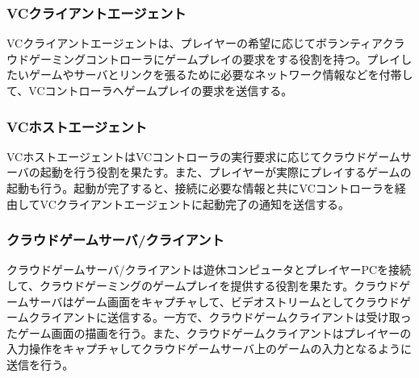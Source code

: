 
\subsubsection{VCクライアントエージェント}
VCクライアントエージェントは、プレイヤーの希望に応じてボランティアクラウドゲーミングコントローラにゲームプレイの要求をする役割を持つ。プレイしたいゲームやサーバとリンクを張るために必要なネットワーク情報などを付帯して、VCコントローラへゲームプレイの要求を送信する。

\subsubsection{VCホストエージェント}
VCホストエージェントはVCコントローラの実行要求に応じてクラウドゲームサーバの起動を行う役割を果たす。また、プレイヤーが実際にプレイするゲームの起動も行う。起動が完了すると、接続に必要な情報と共にVCコントローラを経由してVCクライアントエージェントに起動完了の通知を送信する。

\subsubsection{クラウドゲームサーバ/クライアント}
クラウドゲームサーバ/クライアントは遊休コンピュータとプレイヤーPCを接続して、クラウドゲーミングのゲームプレイを提供する役割を果たす。クラウドゲームサーバはゲーム画面をキャプチャして、ビデオストリームとしてクラウドゲームクライアントに送信する。一方で、クラウドゲームクライアントは受け取ったゲーム画面の描画を行う。また、クラウドゲームクライアントはプレイヤーの入力操作をキャプチャしてクラウドゲームサーバ上のゲームの入力となるように送信を行う。

